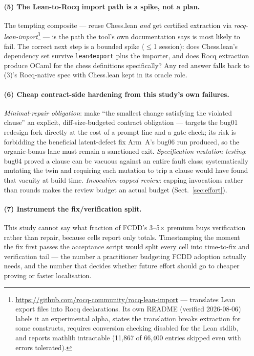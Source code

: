 \documentclass[runningheads]{llncs}
\begin{document}
\paragraph{(5) The Lean-to-Rocq import path is a spike, not a plan.} The
tempting composite --- reuse Chess.lean \emph{and} get certified extraction
via \emph{rocq-lean-import}\footnote{%
\url{https://github.com/rocq-community/rocq-lean-import} --- translates Lean
export files into Rocq declarations. Its own README (verified 2026-08-06)
labels it an experimental alpha, states the translation breaks extraction
for some constructs, requires conversion checking disabled for the Lean
stdlib, and reports mathlib intractable (11{,}867 of 66{,}400 entries
skipped even with errors tolerated).} --- is the path the tool's own
documentation says is most likely to fail. The correct next step is a
bounded spike ($\leq$1 session): does Chess.lean's dependency set survive
\texttt{lean4export} plus the importer, and does Rocq extraction produce
OCaml for the chess definitions specifically? Any red answer falls back to
(3)'s Rocq-native spec with Chess.lean kept in its oracle role.

\paragraph{(6) Cheap contract-side hardening from this study's own
failures.} \emph{Minimal-repair obligation}: make ``the smallest change
satisfying the violated clause'' an explicit, diff-size-budgeted contract
obligation --- targets the bug01 redesign fork directly at the cost of a
prompt line and a gate check; its risk is forbidding the beneficial
latent-defect fix Arm~A's bug06 run produced, so the organic-bonus lane must
remain a sanctioned exit. \emph{Specification mutation testing}: bug04
proved a clause can be vacuous against an entire fault class; systematically
mutating the twin and requiring each mutation to trip a clause would have
found that vacuity at build time. \emph{Invocation-capped review}: capping
invocations rather than rounds makes the review budget an actual budget
(Sect.~\ref{sec:effort}).

\paragraph{(7) Instrument the fix/verification split.} This study cannot say
what fraction of FCDD's 3--5$\times$ premium buys verification rather than
repair, because cells report only totals. Timestamping the moment the fix
first passes the acceptance script would split every cell into time-to-fix
and verification tail --- the number a practitioner budgeting FCDD adoption
actually needs, and the number that decides whether future effort should go
to cheaper proving or faster localisation.
\end{document}
